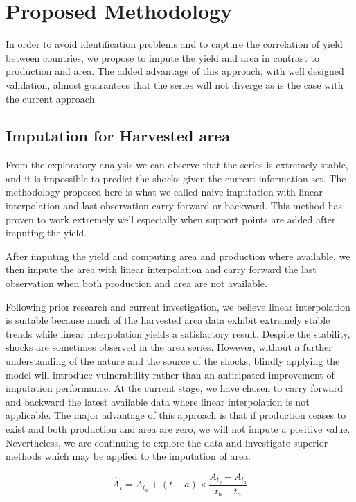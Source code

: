 \documentclass[nojss]{jss}\usepackage[]{graphicx}\usepackage[]{color}
\begin{document}
\section{Proposed Methodology}
In order to avoid identification problems and to capture the
correlation of yield between countries, we propose to impute the yield
and area in contrast to production and area. The added advantage of
this approach, with well designed validation, almost guarantees that
the series will not diverge as is the case with the current approach.




\subsection{Imputation for Harvested area}
From the exploratory analysis we can observe that the series is
extremely stable, and it is impossible to predict the shocks given the
current information set. The methodology proposed here is what we
called naive imputation with linear interpolation and last observation
carry forward or backward. This method has proven to work extremely
well especially when support points are added after imputing the
yield.


After imputing the yield and computing area and production where
available, we then impute the area with linear interpolation and carry
forward the last observation when both production and area are not
available.

Following prior research and current investigation, we believe linear
interpolation is suitable because much of the harvested area data
exhibit extremely stable trends while linear interpolation yields a
satisfactory result. Despite the stability, shocks are sometimes
observed in the area series.  However, without a further understanding
of the nature and the source of the shocks, blindly applying the model
will introduce vulnerability rather than an anticipated improvement of
imputation performance. At the current stage, we have chosen to carry
forward and backward the latest available data where linear
interpolation is not applicable. The major advantage of this approach
is that if production ceases to exist and both production and area are
zero, we will not impute a positive value. Nevertheless, we are
continuing to explore the data and investigate superior methods which
may be applied to the imputation of area.


\begin{equation}
  \label{eq:linearInterpolation}
  \hat{A}_t = A_{t_a} + (t - a) \times \frac{A_{t_b} - A_{t_a}}{t_b - t_a}
\end{equation}
\end{document}
